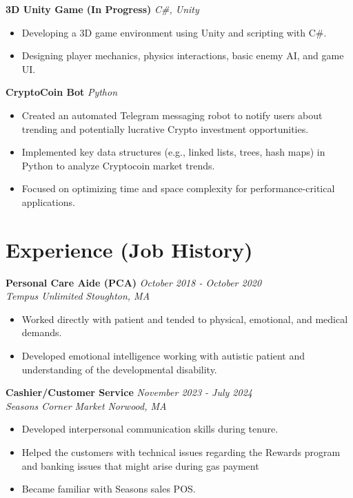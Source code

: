 \documentclass[a4paper,10pt]{article}
\begin{document}
\noindent\textbf{3D Unity Game (In Progress)} \hfill \textit{C\#, Unity} \\
\vspace{-10pt}
\begin{itemize}[leftmargin=1.5em, label={-}]
  \item Developing a 3D game environment using Unity and scripting with C\#.
  \item Designing player mechanics, physics interactions, basic enemy AI, and game UI.
\end{itemize}

\noindent\textbf{CryptoCoin Bot} \hfill \textit{Python} \\
\vspace{-10pt}
\begin{itemize}[leftmargin=1.5em, label={-}]
  \item Created an automated Telegram messaging robot to notify users about trending and potentially lucrative Crypto investment opportunities.
  \item Implemented key data structures (e.g., linked lists, trees, hash maps) in Python to analyze Cryptocoin market trends.
  \item Focused on optimizing time and space complexity for performance-critical applications.
\end{itemize}


\section*{Experience (Job History)}

\noindent\textbf{Personal Care Aide (PCA)} \hfill \textit{October 2018 - October 2020} \\
\textit{Tempus Unlimited} \hfill \textit{Stoughton, MA} \\
\vspace{-5pt}
\begin{itemize}[leftmargin=0.15in, label={-}]
  \item Worked directly with patient and tended to physical, emotional, and medical demands.
  \item Developed emotional intelligence working with autistic patient and understanding of the developmental disability.
\end{itemize}

\noindent\textbf{Cashier/Customer Service} \hfill \textit{November 2023 - July 2024} \\
\textit{Seasons Corner Market} \hfill \textit{Norwood, MA} \\
\vspace{-10pt}
\begin{itemize}[leftmargin=0.15in, label={-}]
  \item Developed interpersonal communication skills during tenure.
  \item Helped the customers with technical issues regarding the Rewards program and banking issues that might arise during gas payment
  \item Became familiar with Seasons sales POS.
\end{itemize}
\end{document}
